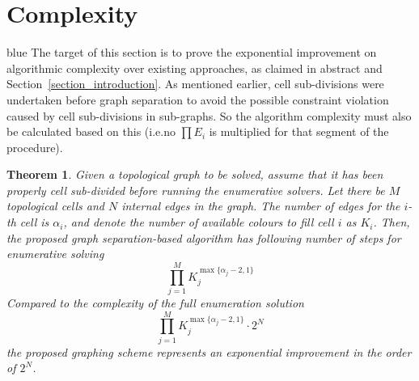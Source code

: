 \documentclass[journal]{IEEEtran}
\newtheorem{theorem}{Theorem}
\begin{document}
\section{Complexity}
\label{section_complexity}
\begin{color}{blue}
The target of this section is to prove the exponential improvement on algorithmic complexity over existing approaches, as claimed in abstract and Section~\ref{section_introduction}. 
As mentioned earlier, cell sub-divisions were undertaken before graph separation to avoid the possible  constraint violation caused by cell sub-divisions in sub-graphs. So the algorithm complexity must also be calculated based on this (i.e.no $\prod E_i$ is multiplied for that segment of the procedure).

\begin{theorem}
Given a topological graph to be solved, assume that it has been properly cell sub-divided before running the enumerative solvers. Let there be $M$ topological cells and $N$ internal edges in the graph. The number of edges for the $i$-th cell is $\alpha_i$, and denote the number of available colours to fill cell $i$ as $K_i$. Then, the proposed graph separation-based algorithm has following number of steps for enumerative solving
\begin{equation}
\prod\limits_{j = 1}^M K_j^{\max\{\alpha_j-2, 1\}}
\end{equation}
Compared to the complexity of the full enumeration solution~\cite{Yang2020Cellular}
\begin{equation}
\prod\limits_{j = 1}^M K_j^{\max\{\alpha_j-2, 1\}}\cdot 2^N
\end{equation}
the proposed graphing scheme represents an exponential improvement in 
the order of $2^N$. 
\end{theorem}
\end{color}
\end{document}
